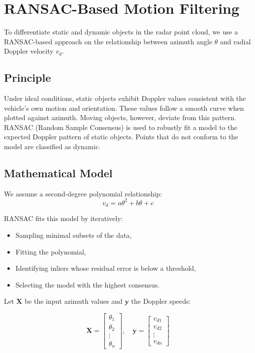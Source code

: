\section{RANSAC-Based Motion Filtering}

To differentiate static and dynamic objects in the radar point cloud, we use a RANSAC-based approach on the relationship between azimuth angle $\theta$ and radial Doppler velocity $v_d$.

\subsection*{Principle}
Under ideal conditions, static objects exhibit Doppler values consistent with the vehicle's own motion and orientation. 
These values follow a smooth curve when plotted against azimuth. 
Moving objects, however, deviate from this pattern.
RANSAC (Random Sample Consensus) is used to robustly fit a model to the expected Doppler pattern of static objects. 
Points that do not conform to the model are classified as dynamic.

\subsection*{Mathematical Model}

We assume a second-degree polynomial relationship:
\[
v_d = a\theta^2 + b\theta + c
\]

RANSAC fits this model by iteratively:
\begin{itemize}
    \item Sampling minimal subsets of the data,
    \item Fitting the polynomial,
    \item Identifying inliers whose residual error is below a threshold,
    \item Selecting the model with the highest consensus.
\end{itemize}

Let $\mathbf{X}$ be the input azimuth values and $\mathbf{y}$ the Doppler speeds:

\[
\mathbf{X} = \begin{bmatrix} \theta_1 \\ \theta_2 \\ \vdots \\ \theta_n \end{bmatrix}, \quad 
\mathbf{y} = \begin{bmatrix} v_{d1} \\ v_{d2} \\ \vdots \\ v_{dn} \end{bmatrix}
\]

